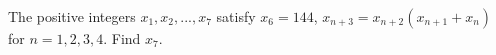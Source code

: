 The positive integers $x_1, x_2, ... , x_7$ satisfy $x_6 = 144$, $x_{n+3} = x_{n+2}(x_{n+1}+x_n)$ for $n = 1, 2, 3, 4$. Find $x_7$.